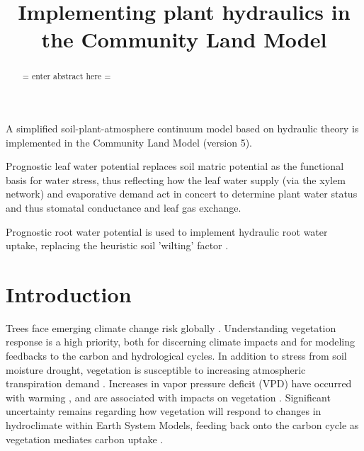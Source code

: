 \documentclass[draft,linenumbers]{agujournal}
\begin{document}
\title{Implementing plant hydraulics in the Community Land Model}



\begin{keypoints}
\item A simplified soil-plant-atmosphere continuum model based on hydraulic theory is implemented in the Community Land Model (version 5).
\item Prognostic leaf water potential replaces soil matric potential as the functional basis for water stress, thus reflecting how the leaf water supply (via the xylem network) and evaporative demand act in concert to determine plant water status and thus stomatal conductance and leaf gas exchange. 
\item Prognostic root water potential is used to implement hydraulic root water uptake, replacing the heuristic soil 'wilting' factor .
\end{keypoints}



\begin{abstract}
= enter abstract here =
\end{abstract}


\section{Introduction}

Trees face emerging climate change risk globally \citep{allen2010,anderegg2013b}.
Understanding vegetation response is a high priority, both for discerning climate impacts and for modeling feedbacks to the carbon and hydrological cycles.
In addition to stress from soil moisture drought, vegetation is susceptible to increasing atmospheric transpiration demand \citep{restaino2016,novick2016b}.
Increases in vapor pressure deficit (VPD) have occurred with warming \citep{ficklin2017,seager2015}, and are associated with impacts on vegetation \citep{williams2013,mcdowell2015}.
Significant uncertainty remains regarding how vegetation will respond to changes in hydroclimate within Earth System Models, feeding back onto the carbon cycle as vegetation mediates carbon uptake \citep{dekauwe2017,friedlingstein2014}.
\end{document}
